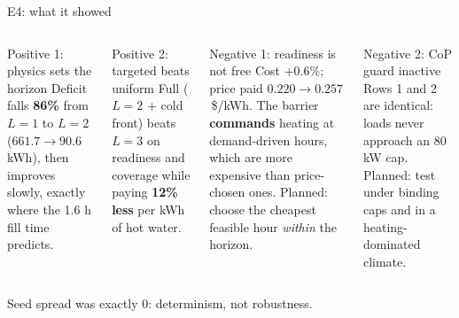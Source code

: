 \documentclass[aspectratio=169,10pt]{beamer}
\begin{document}
\begin{frame}{E4: what it showed}
\begin{columns}[T]
\begin{exampleblock}{Positive 1: physics sets the horizon}
Deficit falls \textbf{86\%} from $L = 1$ to $L = 2$ ($661.7 \rightarrow 90.6$ kWh), then improves slowly, exactly where the 1.6 h fill time predicts.
\end{exampleblock}
\begin{exampleblock}{Positive 2: targeted beats uniform}
Full ($L = 2$ + cold front) beats $L = 3$ on readiness and coverage while paying \textbf{12\% less} per kWh of hot water.
\end{exampleblock}
\begin{alertblock}{Negative 1: readiness is not free}
Cost $+0.6\%$; price paid $0.220 \rightarrow 0.257$\,\$/kWh. The barrier \textbf{commands} heating at demand-driven hours, which are more expensive than price-chosen ones. Planned: choose the cheapest feasible hour \emph{within} the horizon.
\end{alertblock}
\begin{alertblock}{Negative 2: CoP guard inactive}
Rows 1 and 2 are identical: loads never approach an 80 kW cap. Planned: test under binding caps and in a heating-dominated climate.
\end{alertblock}
\end{columns}
\vspace{0.3em}
\small Seed spread was exactly 0: determinism, not robustness.
\end{frame}
\end{document}
